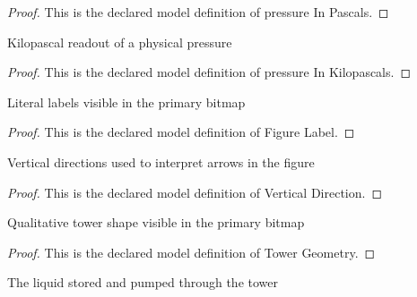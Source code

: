 \begin{proof}
  This is the declared model definition of pressure In Pascals.
\end{proof}
\begin{definition}
  \label{def:physics:phyx-mini-0393:phyxminiproblems-problemphyxmini0393-pressureinkilopascals}
  Kilopascal readout of a physical pressure
\end{definition}
\begin{proof}
  This is the declared model definition of pressure In Kilopascals.
\end{proof}
\begin{definition}
  \label{def:physics:phyx-mini-0393:phyxminiproblems-problemphyxmini0393-figurelabel}
  Literal labels visible in the primary bitmap
\end{definition}
\begin{proof}
  This is the declared model definition of Figure Label.
\end{proof}
\begin{definition}
  \label{def:physics:phyx-mini-0393:phyxminiproblems-problemphyxmini0393-verticaldirection}
  Vertical directions used to interpret arrows in the figure
\end{definition}
\begin{proof}
  This is the declared model definition of Vertical Direction.
\end{proof}
\begin{definition}
  \label{def:physics:phyx-mini-0393:phyxminiproblems-problemphyxmini0393-towergeometry}
  Qualitative tower shape visible in the primary bitmap
\end{definition}
\begin{proof}
  This is the declared model definition of Tower Geometry.
\end{proof}
\begin{definition}
  \label{def:physics:phyx-mini-0393:phyxminiproblems-problemphyxmini0393-towerliquid}
  The liquid stored and pumped through the tower
\end{definition}
